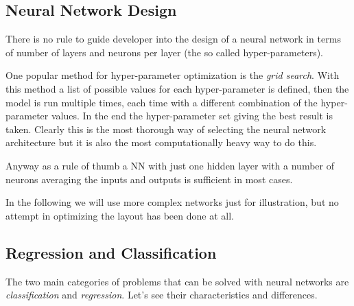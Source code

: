 
\subsection{Neural Network Design}\label{neural-network-design}

There is no rule to guide developer into the design of a neural network
in terms of number of layers and neurons per layer (the so called hyper-parameters). 

One popular method for hyper-parameter optimization is  the \emph{grid search}. 
With this method a list of possible values for each hyper-parameter is defined, then the model is run multiple times, each time with a different combination of the hyper-parameter values. In the end the hyper-parameter set giving 
the best result is taken. Clearly this is the most thorough way of selecting the neural network architecture 
but it is also the most computationally heavy way to do this.

Anyway as a rule of thumb a NN with just one hidden layer with a number
of neurons averaging the inputs and outputs is sufficient in most cases.

In the following we will use more complex networks just for
illustration, but no attempt in optimizing the layout has been done at all.

\subsection{Regression and Classification}\label{regression-and-classification}

The two main categories of problems that can be solved with neural
networks are \emph{classification} and \emph{regression}. Let's see
their characteristics and differences.


